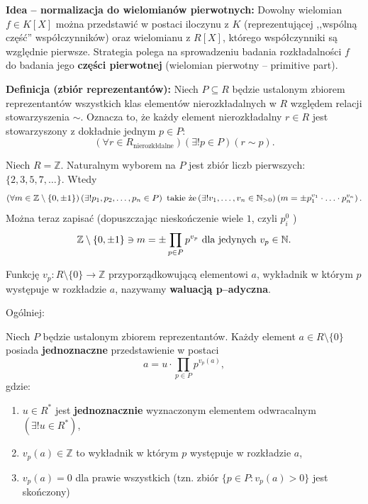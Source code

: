  \noindent \textbf{Idea -- normalizacja do wielomianów pierwotnych:} Dowolny wielomian $f\in K\left[ X \right] $ można przedstawić w postaci iloczynu z $K$ (reprezentującej ,,wspólną część'' współczynników) oraz wielomianu z  $R\left[ X \right] $, którego współczynniki są względnie pierwsze. Strategia polega na sprowadzeniu badania rozkładalności $f$ do badania jego \textbf{części pierwotnej} (wielomian pierwotny -- primitive part). 


\noindent \textbf{Definicja (zbiór reprezentantów):} Niech $P \subseteq R$ będzie ustalonym zbiorem reprezentantów wszystkich klas elementów nierozkładalnych w $R$ względem relacji stowarzyszenia $\sim  $. Oznacza to, że każdy element nierozkładalny $r \in R$ jest stowarzyszony z dokładnie jednym $p \in P$:
\[
\left(\forall r \in R_{\scriptscriptstyle \text{nierozkłdalne}} \right) \left(\exists ! p \in P \right)\left( r \sim p  \right)  
.\] 

\begin{eg}
	Niech $R = \mathbb{Z}$. Naturalnym wyborem na $P$ jest zbiór liczb pierwszych: $\{2,3,5,7,\ldots\} $. Wtedy
	\[
	\left(\forall m \in \mathbb{Z}\setminus \{0, \pm1\}  \right)\left(\exists ! p_1,p_2,\ldots,p_{n} \in P \right)\text{ takie że} \left(\exists ! v_1,\ldots,v_{n} \in \mathbb{N}_{>0} \right)\left( m = \pm p_1^{v_1}\cdot \ldots \cdot p_{n}^{v_{n} } \right)  
	.\] 
Można teraz zapisać (dopuszczając nieskończenie wiele $1$, czyli $p_{i}^{0}$ )
\[
\mathbb{Z} \setminus \{0,\pm 1\} \ni m = \pm \prod_{p \in P} p ^{v_{p}} \text{ dla jedynych $v_{p}\in \mathbb{N}$}
.\] 
\end{eg} 
\begin{definition}
	Funkcję $v_{p} : R\setminus \{0\} \to \mathbb{Z}$ przyporządkowującą elementowi $a$, wykładnik w którym  $p$ występuje w rozkładzie $a$, nazywamy \textbf{waluacją p--adyczna}.
\end{definition} 
\noindent Ogólniej:
\begin{theorem}
	Niech $P$ będzie ustalonym zbiorem reprezentantów. Każdy element $a \in R\setminus \{0\} $ posiada \textbf{jednoznaczne} przedstawienie w postaci
	\[
	a = u\cdot \prod_{p \in P} p^{v_{p}\left( a \right) }  
	,\]
	gdzie:
	\begin{enumerate}[label=\arabic*)]
		\item $u \in R^{\ast} $ jest \textbf{jednoznacznie}  wyznaczonym elementem odwracalnym $\left(\exists ! u \in R^{\ast}  \right) $,
		\item $v_{p}\left( a \right) \in \mathbb{Z}$ to wykładnik w którym $p$ występuje w rozkładzie $a$,
		 \item $v_{p}\left( a \right) = 0 $ dla prawie wszystkich (tzn. zbiór $\{p \in P: v_{p}\left( a \right) > 0\} $ jest skończony)
	\end{enumerate}
\end{theorem} 


